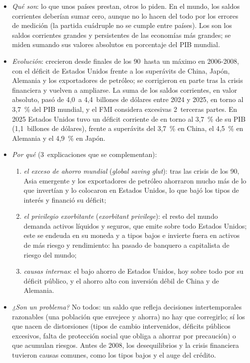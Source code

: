 \documentclass[11pt]{article}
\begin{document}
\begin{itemize}
\item \emph{Qué son}: lo que unos países prestan, otros lo piden. En el mundo, los saldos corrientes deberían sumar cero, aunque no lo hacen del todo por los errores de medición (la partida cuádruple no se cumple entre países). Los  son los saldos corrientes grandes y persistentes de las economías más grandes; se miden sumando sus valores absolutos en porcentaje del PIB mundial.
\item \emph{Evolución}: crecieron desde finales de los 90~hasta un máximo en 2006-2008, con el déficit de Estados Unidos frente a los superávits de China, Japón, Alemania y los exportadores de petróleo; se corrigieron en parte tras la crisis financiera y vuelven a ampliarse. La suma de los saldos corrientes, en valor absoluto, pasó de 4,0~a 4,4~billones de dólares entre 2024 y 2025, en torno al 3,7~\% del PIB mundial, y el FMI considera excesivas 2~terceras partes\nocite{FMI2026ESR,FMI2025ESR}. En 2025 Estados Unidos tuvo un déficit corriente de en torno al 3,7~\% de su PIB (1,1~billones de dólares), frente a superávits del 3,7~\% en China, el 4,5~\% en Alemania y el 4,9~\% en Japón\nocite{FMI2026ESR,FMI2026WEOdatos}.
\item \emph{Por qué} (3~explicaciones que se complementan):
  \begin{enumerate}
  \item \emph{el exceso de ahorro mundial} (\emph{global saving glut}): tras las crisis de los 90, Asia emergente y los exportadores de petróleo ahorraron mucho más de lo que invertían y lo colocaron en Estados Unidos, lo que bajó los tipos de interés y financió su déficit\nocite{Bernanke2005Saving};
  \item \emph{el privilegio exorbitante} (\emph{exorbitant privilege}): el resto del mundo demanda activos líquidos y seguros, que emite sobre todo Estados Unidos; este se endeuda en su moneda y a tipos bajos e invierte fuera en activos de más riesgo y rendimiento: ha pasado de banquero a capitalista de riesgo del mundo\nocite{GourinchasRey2007};
  \item \emph{causas internas}: el bajo ahorro de Estados Unidos, hoy sobre todo por su déficit público, y el ahorro alto con inversión débil de China y de Alemania\nocite{FMI2026ESR}.
  \end{enumerate}
\item \emph{¿Son un problema?} No todos: un saldo que refleja decisiones intertemporales razonables (una población que envejece y ahorra) no hay que corregirlo; sí los que nacen de distorsiones (tipos de cambio intervenidos, déficits públicos excesivos, falta de protección social que obliga a ahorrar por precaución) o que acumulan riesgos\nocite{BlanchardMilesiFerretti2012}. Antes de 2008, los desequilibrios y la crisis financiera tuvieron causas comunes, como los tipos bajos y el auge del crédito\nocite{ObstfeldRogoff2009Imbalances}.

\end{itemize}
\end{document}
